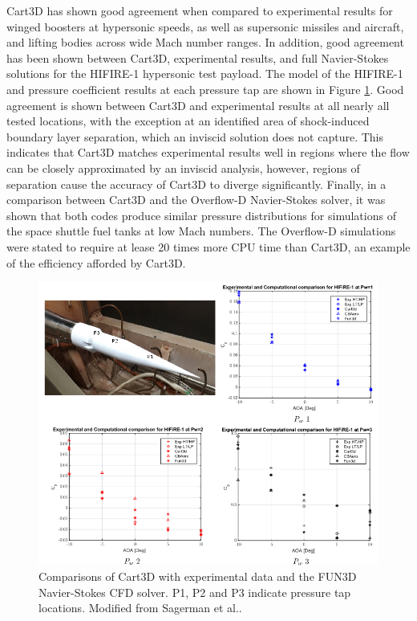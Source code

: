 Cart3D has shown good agreement when compared to experimental results for winged boosters at hypersonic speeds\cite{Sagerman2017}, as well as supersonic missiles\cite{Abeynayake} and aircraft\cite{Aftosmis2011}, and lifting bodies across wide Mach number ranges\cite{Almosnino2016a}.
In addition, good agreement has been shown between Cart3D, experimental results, and full Navier-Stokes solutions for the HIFIRE-1 hypersonic test payload\cite{Sagerman2017}. The model of the HIFIRE-1 and pressure coefficient results at each pressure tap are shown in Figure \ref{fig:Cart3DComparisons}. 
Good agreement is shown between Cart3D and experimental results at all nearly all tested locations, with the exception at an identified area of shock-induced boundary layer separation, which an inviscid solution does not capture\cite{Sagerman2017}. 
This indicates that Cart3D matches experimental results well in regions where the flow can be closely approximated by an inviscid analysis, however, regions of separation cause the accuracy of Cart3D to diverge significantly. 
Finally, in a comparison between Cart3D and the Overflow-D Navier-Stokes solver, it was shown that both codes produce similar pressure distributions for simulations of the space shuttle fuel tanks at low Mach numbers\cite{Gomez2004}. The Overflow-D simulations were stated to require at lease 20 times more CPU time than Cart3D\cite{Gomez2004}, an example of the efficiency afforded by Cart3D.
\begin{figure}[ht]
\centering
\includegraphics[width=0.9\linewidth]{"figures/2_literature-review/Cart3D Comparisons"}
\caption{Comparisons of Cart3D with experimental data and the FUN3D Navier-Stokes CFD solver. P1, P2 and P3 indicate pressure tap locations. Modified from Sagerman et al.\cite{Sagerman2017}.}
\label{fig:Cart3DComparisons}
\end{figure}


